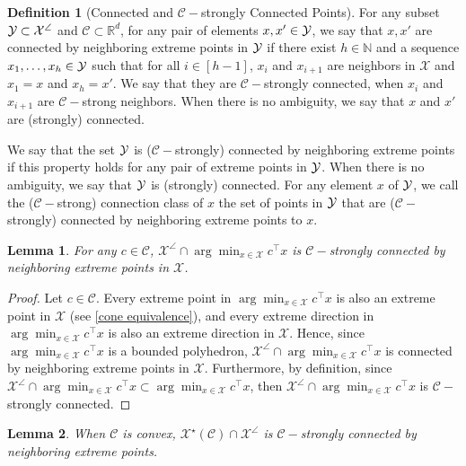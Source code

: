 \documentclass[11pt]{article}
\theoremstyle{plain}
\newtheorem{lemma}{Lemma}
\theoremstyle{definition}
\newtheorem{definition}{Definition}
\newcommand{\R}[0]{\mathbb R}
\newcommand{\dualpoly}[2]{#1^\star\left(#2\right)}
\newcommand{\cX}{\mathcal{X}}
\newcommand{\cC}{\mathcal{C}}
\begin{document}
\begin{definition}[Connected and $\cC-$strongly Connected Points]
    For any subset $\cal Y\subset \cX^\angle$ and $\cC\subset \R^d$, for any pair of elements $x,x'\in \cal Y$, we say that $x,x'$ are connected by neighboring extreme points in $\cal Y$ if there exist $h\in \mathbb N$ and a sequence $x_1,\dots,x_h\in  \cal Y$ such that for all $i\in [h-1]$, $x_i$ and $x_{i+1}$ are neighbors in $\cX$ and $x_1=x$ and $x_h=x'$. We say that they are $\cC-$strongly connected, when $x_i$ and $x_{i+1}$ are $\cC-$strong neighbors.
    When there is no ambiguity, we say that $x$ and $x'$ are (strongly) connected. 
    
    We say that the set $\cal Y$ is ($\cC-$strongly) connected by neighboring extreme points if this property holds for any pair of extreme points in $\cal Y$. When there is no ambiguity, we say that $\cal Y$ is (strongly) connected. For any element $x$ of $\cal Y$, we call the ($\cC-$strong) connection class of $x$ the set of points in $\cal Y$ that are ($\cC-$strongly) connected by neighboring extreme points to $x$.
\end{definition}
\begin{lemma} \label{strong connection in argmin}
    For any $c\in \cC$, $\cX^\angle \cap \arg\min_{x\in \cX}c^\top x$ is $\cC-$strongly connected by neighboring extreme points in $\cX$.
\end{lemma}
\begin{proof}
    Let $c\in \cC$. Every extreme point in $\arg\min_{x\in \cX}c^\top x$ is also an extreme point in $\cX$ (see \cref{cone equivalence}), and every extreme direction in $\arg\min_{x\in \cX}c^\top x$ is also an extreme direction in $\cX$. Hence, since $\arg\min_{x\in \cX}c^\top x$ is a bounded polyhedron, $\cX^\angle \cap \arg\min_{x\in \cX}c^\top x$ is connected by neighboring extreme points in $\cX$. Furthermore, by definition, since $\cX^\angle \cap \arg\min_{x\in \cX}c^\top x\subset \arg\min_{x\in \cX}c^\top x$, then $\cX^\angle \cap \arg\min_{x\in \cX}c^\top x$ is $\cC-$strongly connected.
\end{proof}
\begin{lemma} \label{dual poly is strongly connected}
     When $\cC$ is convex, $\dualpoly{\cX}{\cC}\cap \cX^\angle$ is $\cC-$strongly connected by neighboring extreme points.
\end{lemma}
\end{document}
